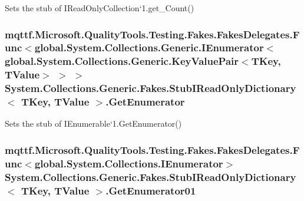 Sets the stub of I\-Read\-Only\-Collection`1.get\-\_\-\-Count()

\hypertarget{class_system_1_1_collections_1_1_generic_1_1_fakes_1_1_stub_i_read_only_dictionary_3_01_t_key_00_01_t_value_01_4_af075c9634ba9b2f6cd00096e9493da84}{
\subsubsection[{Get\-Enumerator}]{\setlength{\rightskip}{0pt plus 5cm}mqttf.\-Microsoft.\-Quality\-Tools.\-Testing.\-Fakes.\-Fakes\-Delegates.\-Func$<$global.\-System.\-Collections.\-Generic.\-I\-Enumerator$<$global.\-System.\-Collections.\-Generic.\-Key\-Value\-Pair$<$T\-Key, T\-Value$>$ $>$ $>$ System.\-Collections.\-Generic.\-Fakes.\-Stub\-I\-Read\-Only\-Dictionary$<$ T\-Key, T\-Value $>$.Get\-Enumerator}}\label{class_system_1_1_collections_1_1_generic_1_1_fakes_1_1_stub_i_read_only_dictionary_3_01_t_key_00_01_t_value_01_4_af075c9634ba9b2f6cd00096e9493da84}


Sets the stub of I\-Enumerable`1.Get\-Enumerator()

\hypertarget{class_system_1_1_collections_1_1_generic_1_1_fakes_1_1_stub_i_read_only_dictionary_3_01_t_key_00_01_t_value_01_4_a5faa3910c945adbd7eb414a68827b65d}{
\subsubsection[{Get\-Enumerator01}]{\setlength{\rightskip}{0pt plus 5cm}mqttf.\-Microsoft.\-Quality\-Tools.\-Testing.\-Fakes.\-Fakes\-Delegates.\-Func$<$global.\-System.\-Collections.\-I\-Enumerator$>$ System.\-Collections.\-Generic.\-Fakes.\-Stub\-I\-Read\-Only\-Dictionary$<$ T\-Key, T\-Value $>$.Get\-Enumerator01}}\label{class_system_1_1_collections_1_1_generic_1_1_fakes_1_1_stub_i_read_only_dictionary_3_01_t_key_00_01_t_value_01_4_a5faa3910c945adbd7eb414a68827b65d}


